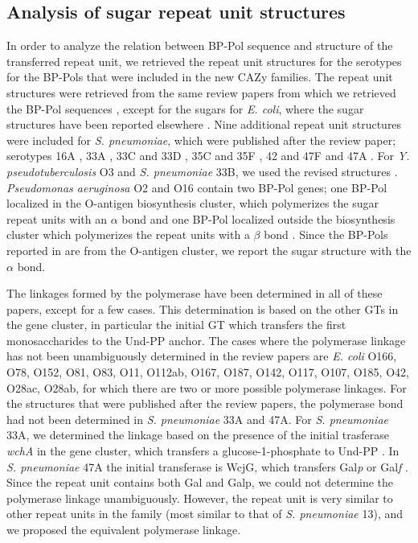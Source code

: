 \documentclass{article}
\begin{document}
\subsection{Analysis of sugar repeat unit structures}

In order to analyze the relation between BP-Pol sequence and structure of the transferred repeat unit, we retrieved the repeat unit structures for the serotypes for the BP-Pols that were included in the new CAZy families. The repeat unit structures were retrieved from the same review papers from which we retrieved the BP-Pol sequences \cite{hu_diversity_2013, bentley_genetic_2006, kenyon_genetics_2017, liu_structural_2014, liu_structure_2008, islam_synthesis_2014}, except for the sugars for \textit{E. coli}, where the sugar structures have been reported elsewhere \cite{liu_structure_2020}. Nine additional repeat unit structures were included for \textit{S. pneumoniae}, which were published after the review paper; serotypes 16A \cite{li_structural_2019}, 33A \cite{lin_identification_2013}, 33C and 33D \cite{lin_structure_2014}, 35C and 35F \cite{bush_structures_2015}, 42 and 47F \cite{petersen_determination_2014} and 47A \cite{petersen_structural_2014}. For \textit{Y. pseudotuberculosis} O3 and \textit{S. pneumoniae} 33B, we used the revised structures \cite{kondakova_reinvestigation_2008, lin_structure_2014}. \textit{Pseudomonas aeruginosa} O2 and O16 contain two BP-Pol genes; one BP-Pol localized in the O-antigen biosynthesis cluster, which polymerizes the sugar repeat units with an $\alpha$ bond and one BP-Pol localized outside the biosynthesis cluster which polymerizes the repeat units with a $\beta$ bond \cite{lam_genetic_2011}. Since the BP-Pols reported in \cite{islam_synthesis_2014} are from the O-antigen cluster, we report the sugar structure with the $\alpha$ bond. 

The linkages formed by the polymerase have been determined in all of these papers, except for a few cases. This determination is based on the other GTs in the gene cluster, in particular the initial GT which transfers the first monosaccharides to the Und-PP anchor. The cases where the polymerase linkage has not been unambiguously determined in the review papers are \textit{E. coli} O166, O78, O152, O81, O83, O11, O112ab, O167, O187, O142, O117, O107, O185, O42, O28ac, O28ab, for which there are two or more possible polymerase linkages. For the structures that were published after the review papers, the polymerase bond had not been determined in \textit{S. pneumoniae} 33A and 47A. For \textit{S. pneumoniae} 33A, we determined the linkage based on the presence of the initial trasferase \textit{wchA} in the gene cluster, which transfers a glucose-1-phosphate to Und-PP \cite{bentley_genetic_2006}. In \textit{S. pneumoniae} 47A the initial transferase is WcjG, which transfers Gal\textit{p} or Gal\textit{f} \cite{bentley_genetic_2006}. Since the repeat unit contains both Gal and Galp, we could not determine the polymerase linkage unambiguously. However, the repeat unit is very similar to other repeat units in the family (most similar to that of \textit{S. pneumoniae} 13), and we proposed the equivalent polymerase linkage.
\end{document}
